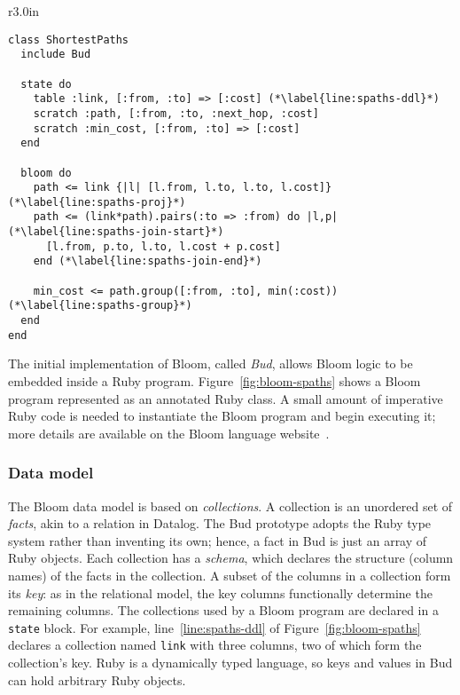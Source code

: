 \begin{wrapfigure}[=18]{r}{3.0in}
\begin{scriptsize}
\begin{lstlisting}
class ShortestPaths
  include Bud

  state do
    table :link, [:from, :to] => [:cost] (*\label{line:spaths-ddl}*)
    scratch :path, [:from, :to, :next_hop, :cost]
    scratch :min_cost, [:from, :to] => [:cost]
  end

  bloom do
    path <= link {|l| [l.from, l.to, l.to, l.cost]} (*\label{line:spaths-proj}*)
    path <= (link*path).pairs(:to => :from) do |l,p| (*\label{line:spaths-join-start}*)
      [l.from, p.to, l.to, l.cost + p.cost]
    end (*\label{line:spaths-join-end}*)

    min_cost <= path.group([:from, :to], min(:cost)) (*\label{line:spaths-group}*)
  end
end
\end{lstlisting}
\end{scriptsize}
\caption{All-pairs shortest paths of a directed graph in Bloom.}
\label{fig:bloom-spaths}
\end{wrapfigure}
The initial implementation of Bloom, called \emph{Bud}, allows Bloom logic to be
embedded inside a Ruby program. Figure~\ref{fig:bloom-spaths} shows a Bloom
program represented as an annotated Ruby class. A small amount of imperative
Ruby code is needed to instantiate the Bloom program and begin executing it;
more details are available on the Bloom language website~\cite{bloom}.

\subsubsection{Data model}

The Bloom data model is based on \emph{collections}.  A collection is an
unordered set of \emph{facts}, akin to a relation in Datalog. The Bud prototype
adopts the Ruby type system rather than inventing its own; hence, a fact in Bud
is just an array of Ruby objects. Each collection has a \emph{schema}, which
declares the structure (column names) of the facts in the collection. A subset
of the columns in a collection form its \emph{key}: as in the relational model,
the key columns functionally determine the remaining columns. The collections
used by a Bloom program are declared in a \texttt{state} block. For example,
line~\ref{line:spaths-ddl} of Figure~\ref{fig:bloom-spaths} declares a
collection named \texttt{link} with three columns, two of which form the
collection's key. Ruby is a dynamically typed language, so keys and values in
Bud can hold arbitrary Ruby objects.

